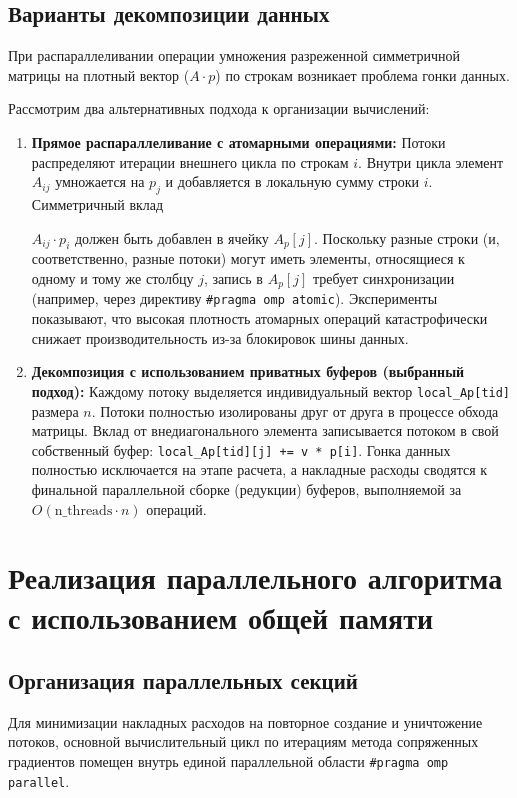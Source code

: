 \documentclass[12pt, a4paper]{article}
\begin{document}
\subsection{Варианты декомпозиции данных}
При распараллеливании операции умножения разреженной симметричной матрицы на плотный вектор ($A \cdot p$) 
по строкам возникает проблема гонки данных. 

Рассмотрим два альтернативных подхода к организации вычислений:
\begin{enumerate}
    \item \textbf{Прямое распараллеливание с атомарными операциями:}
    Потоки распределяют итерации внешнего цикла по строкам $i$. Внутри цикла элемент $A_{ij}$ умножается на $p_j$ и добавляется в локальную сумму строки $i$. Симметричный вклад

$A_{ij} \cdot p_i$ должен быть добавлен в ячейку $A_p[j]$. Поскольку разные строки (и, соответственно, разные потоки) могут иметь элементы, относящиеся к одному и тому же столбцу $j$, запись в $A_p[j]$ требует синхронизации (например, через директиву \texttt{\#pragma omp atomic}). Эксперименты показывают, что высокая плотность атомарных операций катастрофически снижает производительность из-за блокировок шины данных.
    
    \item \textbf{Декомпозиция с использованием приватных буферов (выбранный подход):}
    Каждому потоку выделяется индивидуальный вектор \texttt{local\_Ap[tid]} размера $n$. Потоки полностью изолированы друг от друга в процессе обхода матрицы. Вклад от внедиагонального элемента записывается потоком в свой собственный буфер: \texttt{local\_Ap[tid][j] += v * p[i]}. Гонка данных полностью исключается на этапе расчета, а накладные расходы сводятся к финальной параллельной сборке (редукции) буферов, выполняемой за $O(\text{n\_threads} \cdot n)$ операций.
\end{enumerate}

\section{Реализация параллельного алгоритма с использованием общей памяти}

\subsection{Организация параллельных секций}
Для минимизации накладных расходов на повторное создание и уничтожение потоков, основной 
вычислительный цикл по итерациям метода сопряженных градиентов помещен внутрь единой параллельной области 
\texttt{\#pragma omp parallel}.
\end{document}
